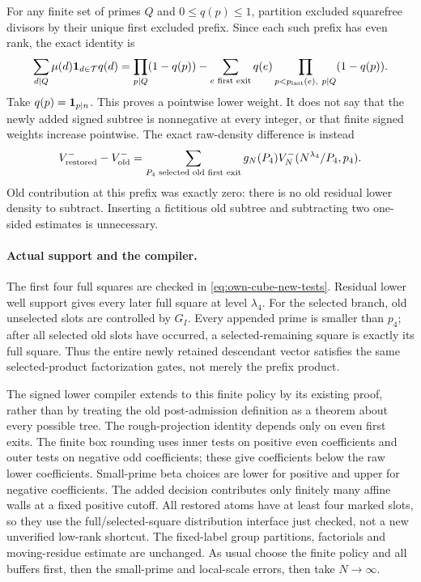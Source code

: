 For any finite set of primes $Q$ and $0\le q(p)\le1$, partition
excluded squarefree divisors by their unique first excluded prefix.
Since each such prefix has even rank, the exact identity is
\[
 \sum_{d\mid Q}\mu(d){\bf1}_{d\in\mathcal T}q(d)
 =\prod_{p\mid Q}(1-q(p))
  -\sum_{e\text{ first exit}}q(e)
                \prod_{p< p_{\rm last}(e),\ p\mid Q}(1-q(p)).
\]
Take $q(p)={\bf1}_{p\mid n}$. This proves a pointwise lower weight.
It does not say that the newly added signed subtree is nonnegative
at every integer, or that finite signed weights increase pointwise.
The exact raw-density difference is instead
\begin{equation}\label{eq:own-cube-exact-difference}
 V^-_{\rm restored}-V^-_{\rm old}
 =\sum_{P_4\text{ selected old first exit}}
          g_N(P_4)V_N^-(N^{\lambda_4}/P_4,p_4).
\end{equation}
Old contribution at this prefix was exactly zero: there is no old
residual lower density to subtract. Inserting a fictitious old
subtree and subtracting two one-sided estimates is unnecessary.

\paragraph{Actual support and the compiler.}
The first four full squares are checked in
\eqref{eq:own-cube-new-tests}. Residual lower well support gives
every later full square at level $\lambda_4$. For the selected
branch, old unselected slots are controlled by $G_I$. Every appended
prime is smaller than $p_4$; after all selected old slots have
occurred, a selected-remaining square is exactly its full square.
Thus the entire newly retained descendant vector satisfies the same
selected-product factorization gates, not merely the prefix product.

The signed lower compiler extends to this finite policy by its
existing proof, rather than by treating the old post-admission
definition as a theorem about every possible tree. The rough-projection
identity depends only on even first exits. The finite box rounding
uses inner tests on positive even coefficients and outer tests on
negative odd coefficients; these give coefficients below the raw
lower coefficients. Small-prime beta choices are lower for positive
and upper for negative coefficients. The added decision contributes
only finitely many affine walls at a fixed positive cutoff.
All restored atoms have at least four marked slots, so they use the
full/selected-square distribution interface just checked, not a new
unverified low-rank shortcut. The fixed-label group partitions,
factorials and moving-residue estimate are unchanged.
As usual choose the finite policy and all buffers first, then the
small-prime and local-scale errors, then take $N\to\infty$.


